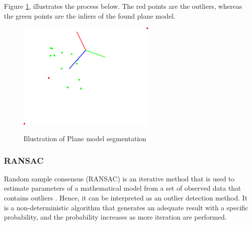\documentclass[12pt]{report}
\begin{document}
Figure \ref{fig:plane_seg}, illustrates the process below. The red points are the outliers, whereas the green points are the inliers of the found plane model.

\begin{figure}[H]%
  \centering
  \includegraphics[width=0.6\textwidth]{planar_segmentation_2.png}
 \caption{Illustration of Plane model segmentation}\cite[]{SHCHUROVA201576}
 \label{fig:plane_seg} 
\end{figure}





\subsubsection{RANSAC}
\label{section:ransac}
Random sample consensus (RANSAC) is an iterative method that is used to estimate parameters of a mathematical model from a set of observed data that contains outliers .
Hence, it can be interpreted as an outlier detection method. It is a non-deterministic algorithm that generates an adequate result with a specific probability, and the probability increases as more iteration are performed.
\end{document}
